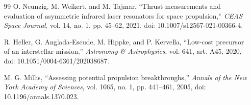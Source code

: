 \documentclass[conference]{../../../../Conference-LaTeX-template_10-17-19/IEEEtran}
\begin{document}
\begin{thebibliography}{99}
O. Neunzig, M. Weikert, and M. Tajmar, ``Thrust measurements and evaluation of asymmetric infrared laser resonators for space propulsion,'' \textit{CEAS Space Journal}, vol. 14, no. 1, pp. 45--62, 2021, doi: 10.1007/s12567-021-00366-4.

R. Heller, G. Anglada-Escude, M. Hippke, and P. Kervella, ``Low-cost precursor of an interstellar mission,'' \textit{Astronomy \& Astrophysics}, vol. 641, art. A45, 2020, doi: 10.1051/0004-6361/202038687.

M. G. Millis, ``Assessing potential propulsion breakthroughs,'' \textit{Annals of the New York Academy of Sciences}, vol. 1065, no. 1, pp. 441--461, 2005, doi: 10.1196/annals.1370.023.
\end{thebibliography}
\end{document}
